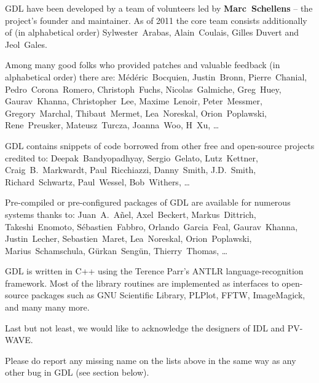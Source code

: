 
GDL have been developed by a team of volunteers led by {\bf Marc~Schellens} --
  the project's founder and maintainer.
As of 2011 the core team consists additionally of (in alphabetical order)
  Sylwester~Arabas, Alain~Coulais, Gilles Duvert and Jeol~Gales.

Among many good folks who provided patches and valuable feedback (in alphabetical order) there are:
M\'ed\'eric~Bocquien, %
Justin~Bronn, %
Pierre~Chanial, %
Pedro~Corona~Romero, %
Christoph~Fuchs, %
Nicolas~Galmiche, %
Greg~Huey, %
Gaurav~Khanna, %
Christopher~Lee, %
Maxime~Lenoir, %
Peter~Messmer, %
Gregory~Marchal, %
Thibaut~Mermet, %
Lea~Noreskal, %
Orion~Poplawski, %
Rene~Preusker, %
Mateusz~Turcza, %
Joanna~Woo, %
H~Xu, %
\ldots

GDL contains snippets of code borrowed from other free and open-source projects credited to:
Deepak~Bandyopadhyay, %
Sergio~Gelato, %
Lutz~Kettner, %
Craig~B.~Markwardt, %
Paul~Ricchiazzi, %
Danny~Smith, %
J.D.~Smith, %
Richard~Schwartz, %
Paul~Wessel, %
Bob~Withers, %
\ldots

Pre-compiled or pre-configured packages of GDL are available for numerous systems thanks to:
Juan~A.~A\~nel, %
Axel~Beckert, %
Markus~Dittrich, %
Takeshi~Enomoto, %
S\'ebastien~Fabbro, %
Orlando~Garcia~Feal, %
Gaurav~Khanna, %
Justin~Lecher, %
Sebastien~Maret, %
Lea~Noreskal, %
Orion~Poplawski, %
Marius~Schamschula, %
G\"urkan~Seng\"un, %
Thierry~Thomas, %
\ldots

GDL is written in C++ using the Terence Parr's ANTLR language-recognition framework. 
Most of the library routines are implemented as interfaces to open-source packages 
  such as GNU Scientific Library, PLPlot, FFTW, ImageMagick, and many many more. 

Last but not least, we would like to acknowledge the designers of IDL and PV-WAVE.

Please do report any missing name on the lists above in the same way
  as any other bug in GDL (see section below).
